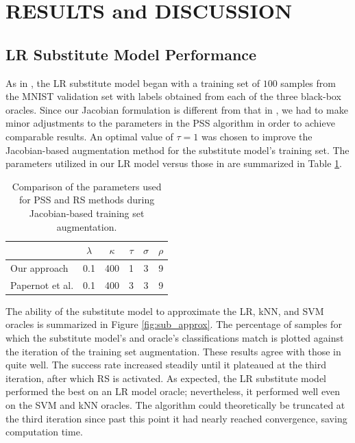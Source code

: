 \section{RESULTS and DISCUSSION}

\subsection{LR Substitute Model Performance} \label{subsec:sub_model}

As in \cite{papernot3}, the LR substitute model began with a training set of $100$ samples from the MNIST validation set with labels obtained from each of the three black-box oracles. Since our Jacobian formulation is different from that in \cite{papernot3}, we had to make minor adjustments to the parameters in the PSS algorithm in order to achieve comparable results. An optimal value of $\tau = 1$ was chosen to improve the Jacobian-based augmentation method for the substitute model's training set. The parameters utilized in our LR model versus those in \cite{papernot3} are summarized in Table \ref{tab:params}. 

\begin{table}[h]
	\caption{Comparison of the parameters used for PSS and RS methods during Jacobian-based training set augmentation.}
	\vskip 0.15in
 \label{tab:params}
\begin{center}
	\begin{small}
		\begin{sc}
			\begin{tabular}{lccccr}
				\hline
				\abovespace\belowspace
				& $\lambda$ & $\kappa$ & $\tau$ & $\sigma$ & $\rho$ \\
				\hline
				\abovespace
				Our approach & 0.1 & 400 & 1 & 3 & 9 \\
				Papernot et al. & 0.1 & 400 & 3 & 3 & 9 \\
				\hline
			\end{tabular}
		\end{sc}
	\end{small}
\end{center}
\vskip -0.1in
\end{table}

The ability of the substitute model to approximate the LR, kNN, and SVM oracles is summarized in Figure \ref{fig:sub_approx}. The percentage of samples for which the substitute model's and oracle's classifications match is plotted against the iteration of the training set augmentation. These results agree with those in \cite{papernot3} quite well. The success rate increased steadily until it plateaued at the third iteration, after which RS is activated. As expected, the LR substitute model performed the best on an LR model oracle; nevertheless, it performed well even on the SVM and kNN oracles. The algorithm could theoretically be truncated at the third iteration since past this point it had nearly reached convergence, saving computation time.

